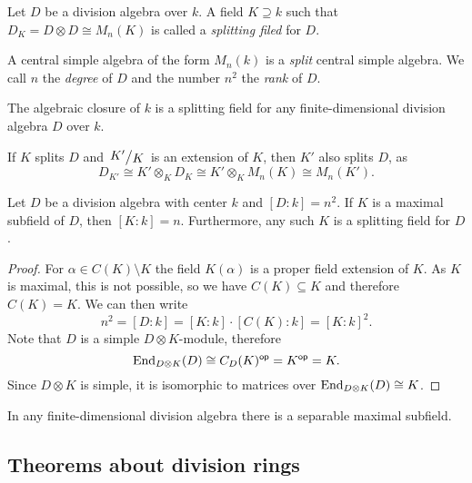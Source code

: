 \begin{definicija}
Let $D$ be a division algebra over $k$. A field $K \supseteq k$
such that $D_K = D \otimes D \cong M_n(K)$ is called a
\emph{splitting filed} for $D$.

A central simple algebra of the form $M_n(k)$ is a
\emph{split} central simple
algebra. We call $n$ the \emph{degree} of $D$ and the
number $n^2$ the \emph{rank} of $D$.
\end{definicija}

\begin{opomba}
The algebraic closure of $k$ is a splitting field for any
finite-dimensional division algebra $D$ over $k$.
\end{opomba}

\begin{opomba}
If $K$ splits $D$ and $\kvoc{K'}{K}$ is an extension of $K$, then
$K'$ also splits $D$, as
\[
D_{K'} \cong K' \otimes_K D_K \cong
K' \otimes_K M_n(K) \cong M_n(K').
\]
\end{opomba}

\begin{trditev}\label{thm_divr:prop:fie_dim}
Let $D$ be a division algebra with center $k$ and $[D : k] = n^2$.
If $K$ is a maximal subfield of $D$, then $[K : k] = n$.
Furthermore, any such $K$ is a splitting field for $D$.
\end{trditev}

\begin{proof}
For $\alpha \in C(K) \setminus K$ the field $K(\alpha)$ is a proper
field extension of $K$. As $K$ is maximal, this is not possible,
so we have $C(K) \subseteq K$ and therefore $C(K) = K$. We can then
write
\[
n^2 = [D : k] = [K : k] \cdot [C(K) : k] = [K : k]^2.
\]
Note that $D$ is a simple $D \otimes K$-module, therefore
\[
\operatorname{End}_{D \otimes K}(D) \cong
C_D(K)^{\mathsf{op}} =
K^{\mathsf{op}} =
K.
\]
Since $D \otimes K$ is simple, it is isomorphic to matrices over
$\operatorname{End}_{D \otimes K}(D) \cong K$.
\end{proof}

\begin{izrek}
In any finite-dimensional division algebra there is a separable
maximal subfield.
\end{izrek}

\newpage

\subsection{Theorems about division rings}

